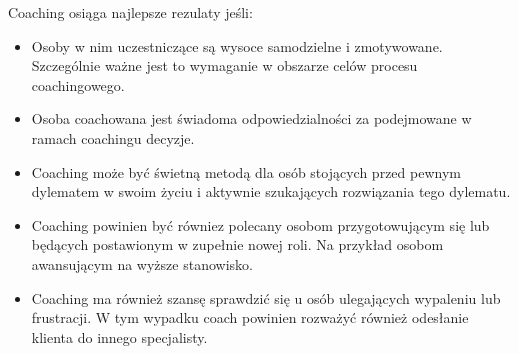 Coaching osiąga najlepsze rezulaty jeśli:
\begin{itemize}
  \item Osoby w nim uczestniczące są wysoce samodzielne i zmotywowane. Szczególnie ważne jest to wymaganie w obszarze celów procesu coachingowego.
  \item Osoba coachowana jest świadoma odpowiedzialności za podejmowane w ramach coachingu decyzje.
  \item Coaching może być świetną metodą dla osób stojących przed pewnym dylematem w swoim życiu i aktywnie szukających rozwiązania tego dylematu.
  \item Coaching powinien być równiez polecany osobom przygotowującym się lub będących postawionym w zupełnie nowej roli.
        Na przykład osobom awansującym na wyższe stanowisko.
  \item Coaching ma również szansę sprawdzić się u osób ulegających wypaleniu lub frustracji. W tym wypadku coach powinien rozważyć również odesłanie
        klienta do innego specjalisty.
\end{itemize}
